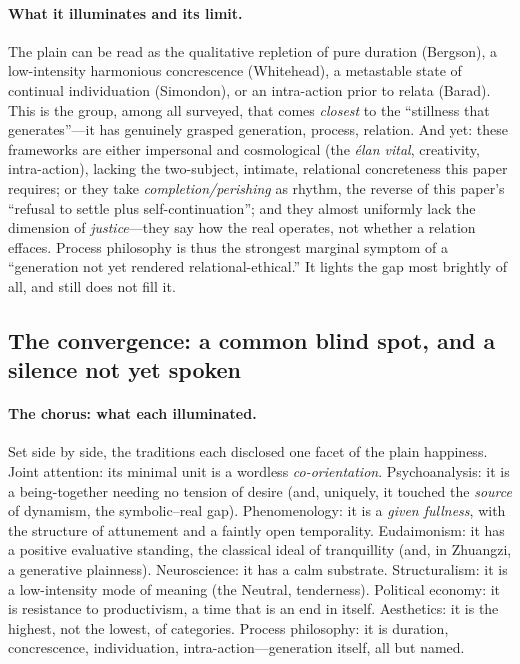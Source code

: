 \paragraph{What it illuminates and its limit.} The plain can be read as the qualitative repletion of pure duration (Bergson), a low-intensity harmonious concrescence (Whitehead), a metastable state of continual individuation (Simondon), or an intra-action prior to relata (Barad). This is the group, among all surveyed, that comes \emph{closest} to the ``stillness that generates''---it has genuinely grasped generation, process, relation. And yet: these frameworks are either impersonal and cosmological (the \emph{élan vital}, creativity, intra-action), lacking the two-subject, intimate, relational concreteness this paper requires; or they take \emph{completion/perishing} as rhythm, the reverse of this paper's ``refusal to settle plus self-continuation''; and they almost uniformly lack the dimension of \emph{justice}---they say how the real operates, not whether a relation effaces. Process philosophy is thus the strongest marginal symptom of a ``generation not yet rendered relational-ethical.'' It lights the gap most brightly of all, and still does not fill it.

\subsection{The convergence: a common blind spot, and a silence not yet spoken}
\label{p19:sub:theories-convergence}

\paragraph{The chorus: what each illuminated.} Set side by side, the traditions each disclosed one facet of the plain happiness. Joint attention: its minimal unit is a wordless \emph{co-orientation}. Psychoanalysis: it is a being-together needing no tension of desire (and, uniquely, it touched the \emph{source} of dynamism, the symbolic--real gap). Phenomenology: it is a \emph{given fullness}, with the structure of attunement and a faintly open temporality. Eudaimonism: it has a positive evaluative standing, the classical ideal of tranquillity (and, in Zhuangzi, a generative plainness). Neuroscience: it has a calm substrate. Structuralism: it is a low-intensity mode of meaning (the Neutral, tenderness). Political economy: it is resistance to productivism, a time that is an end in itself. Aesthetics: it is the highest, not the lowest, of categories. Process philosophy: it is duration, concrescence, individuation, intra-action---generation itself, all but named.

